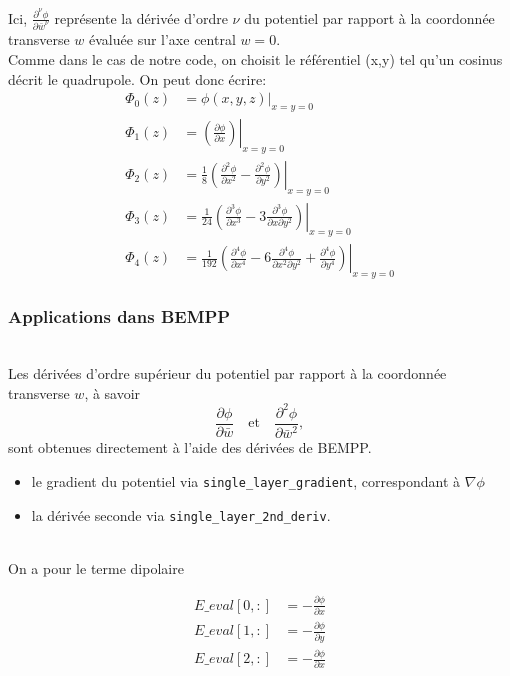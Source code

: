 \documentclass{article}
\begin{document}
Ici, $\frac{\partial^{\nu} \phi}{\partial \bar w^{\nu}}$ représente la dérivée d'ordre $\nu$ du potentiel par rapport à la coordonnée transverse $w$ évaluée sur l'axe central $w=0$.  
\
\\
Comme dans le cas de notre code, on choisit le référentiel (x,y) tel qu'un cosinus décrit le quadrupole. On peut donc écrire:
\\
\[
\begin{aligned}
\Phi_0(z) &= \phi(x,y,z)\big|_{x=y=0} \\[1em]
\Phi_1(z) &=\left.\left(\frac{\partial \phi}{\partial x}\right)\right|_{x=y=0} \\[1em]
\Phi_2(z) &=\left.\frac{1}{8}\left(\frac{\partial^{2} \phi}{\partial x^{2}}-\frac{\partial^{2} \phi}{\partial y^{2}}\right)\right|_{x=y=0} \\[1em]
\Phi_3(z) &=\left.\frac{1}{24}\left(\frac{\partial^{3} \phi}{\partial x^{3}}-3 \frac{\partial^{3} \phi}{\partial x \partial y^{2}}\right)\right|_{x=y=0} \\[1em]
\Phi_4(z) &=\left.\frac{1}{192}\left(\frac{\partial^{4} \phi}{\partial x^{4}}-6 \frac{\partial^{4} \phi}{\partial x^{2} \partial y^{2}}+\frac{\partial^{4} \phi}{\partial y^{4}}\right)\right|_{x=y=0}
\end{aligned}
\]
\subsubsection{Applications dans BEMPP}
\
\\
Les dérivées d’ordre supérieur du potentiel par rapport à la coordonnée transverse $w$, à savoir
\[
\frac{\partial \phi}{\partial \bar w}
\quad \text{et} \quad
\frac{\partial^2 \phi}{\partial \bar w^2},
\]
sont obtenues directement à l’aide des dérivées de BEMPP.
\
\\
\begin{itemize}
  \item le gradient du potentiel via \texttt{single\_layer\_gradient}, correspondant à $\nabla \phi$ 
  \item la dérivée seconde via \texttt{single\_layer\_2nd\_deriv}.
\end{itemize}
\
\\
On a pour le terme dipolaire 

\begin{align*}
E\_eval[0, :]  &= -\frac{\partial \phi}{\partial x} \\
E\_eval[1, :]  &= -\frac{\partial \phi}{\partial y }\\
E\_eval[2, :]  &= -\frac{\partial \phi}{\partial x }\\
\end{align*}
\end{document}
